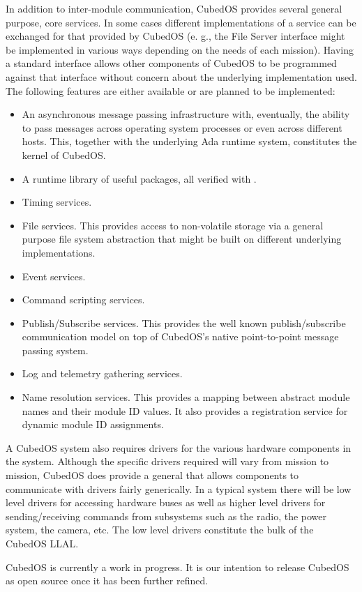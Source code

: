 
In addition to inter-module communication, CubedOS provides several general purpose, core
services. In some cases different implementations of a service can be exchanged for that
provided by CubedOS (e. g., the File Server interface might be implemented in various ways
depending on the needs of each mission). Having a standard interface allows other components of
CubedOS to be programmed against that interface without concern about the underlying
implementation used. The following features are either available or are planned to be
implemented:

\begin{itemize}
\item An asynchronous message passing infrastructure with, eventually, the ability to pass
  messages across operating system processes or even across different hosts. This, together with
  the underlying Ada runtime system, constitutes the kernel of CubedOS.
\item A runtime library of useful packages, all verified with \SPARK.
\item Timing services.
\item File services. This provides access to non-volatile storage via a general purpose file
  system abstraction that might be built on different underlying implementations.
\item Event services.
\item Command scripting services.
\item Publish/Subscribe services. This provides the well known publish/subscribe communication
  model on top of CubedOS's native point-to-point message passing system.
\item Log and telemetry gathering services.
\item Name resolution services. This provides a mapping between abstract module names and their
  module ID values. It also provides a registration service for dynamic module ID assignments.
\end{itemize}

A CubedOS system also requires drivers for the various hardware components in the system.
Although the specific drivers required will vary from mission to mission, CubedOS does provide a
general  that allows components to communicate with drivers fairly
generically. In a typical system there will be low level drivers for accessing hardware buses
as well as higher level drivers for sending/receiving commands from subsystems such as the
radio, the power system, the camera, etc. The low level drivers constitute the bulk of the
CubedOS LLAL.

CubedOS is currently a work in progress. It is our intention to release CubedOS as open source
once it has been further refined.
